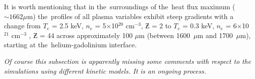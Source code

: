 It is worth mentioning that in the~surroundings of the~heat flux maximum 
($\sim 1662 \mu$m) the~profiles of all plasma variables exhibit steep gradients 
with a change from $T_e$ = 2.5 keV, $n_e$ = 5$\times$10$^{20}$ cm$^{−3}$, 
$\Zbar$ = 2 to $T_e$ = 0.3 keV, $n_e$ = 6$\times$10$^{21}$ cm$^{−3}$ , 
$\Zbar$ = 44 across approximately 100 $\mu$m 
(between 1600~$\mu$m and 1700~$\mu$m), starting at the~helium-gadolinium 
interface.  

\textit{Of course this subsection is apparently missing some comments 
with respect to the simulations using different kinetic models. 
It is an ongoing process.}

\begin{figure}[tbh]
  \begin{center}
    \begin{tabular}{c}
    \end{tabular}
  \caption{
  }
  \label{fig:Gd_VFP_10ps_heatflux}
  \end{center} 
\end{figure}



%
